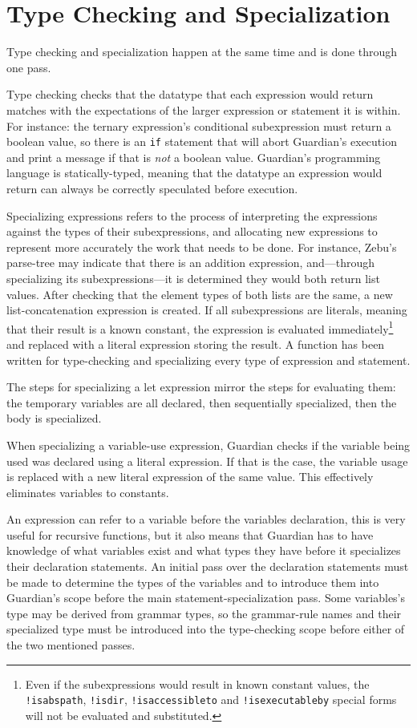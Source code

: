 
\section{Type Checking and Specialization}
{
	Type checking and specialization happen at the same time and is done
	through one pass.
	
	Type checking checks that the datatype that each expression would return
	matches with the expectations of the larger expression or statement it
	is within. For instance: the ternary expression's conditional subexpression
	must return a boolean value, so there is an \texttt{if} statement that will
	abort Guardian's execution and print a message if that
	is \textit{not} a boolean value.
	Guardian's programming language is statically-typed, meaning
	that the datatype an expression would return can always be correctly
	speculated before execution.
	
	Specializing expressions refers to the process
	of interpreting the expressions
	against the types of their subexpressions, and allocating new expressions
	to represent more accurately the work that needs to be done.
	For instance, Zebu's parse-tree may
	indicate that there is an addition expression, and---through specializing
	its subexpressions---it is determined they would both return
	list values. After checking that the element types of both lists are the
	same, a new list-concatenation expression is created.
	If all subexpressions are literals, meaning that their result is a known
	constant, the expression is evaluated immediately\footnote{Even if
	the subexpressions would result in known constant values, the
	\texttt{!isabspath}, \texttt{!isdir}, \texttt{!isaccessibleto}
	and \texttt{!isexecutableby} special forms will not be evaluated and
	substituted.} and replaced with a literal expression storing the result.
	A function has been written for type-checking and specializing every
	type of expression and statement.
	
	The steps for specializing a let expression mirror the steps for
	evaluating them: the temporary variables are all declared, then sequentially
	specialized, then the body is specialized.
	
	When specializing a variable-use expression, Guardian checks if the
	variable being used was declared using a literal expression. If that
	is the case, the variable usage is replaced with a new literal expression
	of the same value. This effectively eliminates variables to constants.
	
	An expression can refer to a variable before the variables declaration,
	this is very useful for recursive functions, but it also means that
	Guardian has to have knowledge of what variables exist and what
	types they have before it
	specializes their declaration statements. An initial pass over
	the declaration statements
	must be made to determine the types of the variables and to introduce them
	into Guardian's scope before the main
	statement-specialization pass. Some variables's type may be derived from
	grammar types, so the grammar-rule names and their specialized type must
	be introduced into the type-checking scope before either of the two
	mentioned passes.
	
}
